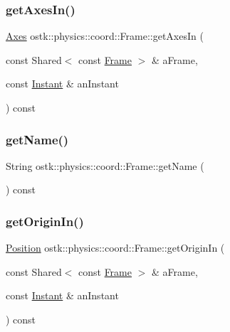 \mbox{\label{classostk_1_1physics_1_1coord_1_1_frame_ac75780963694dd74ea2e6a66f6ae17d8}} 
\subsubsection{\texorpdfstring{get\+Axes\+In()}{getAxesIn()}}
{\footnotesize\ttfamily \hyperlink{classostk_1_1physics_1_1coord_1_1_axes}{Axes} ostk\+::physics\+::coord\+::\+Frame\+::get\+Axes\+In (\begin{DoxyParamCaption}\item[{const Shared$<$ const \hyperlink{classostk_1_1physics_1_1coord_1_1_frame}{Frame} $>$ \&}]{a\+Frame,  }\item[{const \hyperlink{classostk_1_1physics_1_1time_1_1_instant}{Instant} \&}]{an\+Instant }\end{DoxyParamCaption}) const}

\mbox{\label{classostk_1_1physics_1_1coord_1_1_frame_a47aca195a73e14198f6d615c8988ce6e}} 
\subsubsection{\texorpdfstring{get\+Name()}{getName()}}
{\footnotesize\ttfamily String ostk\+::physics\+::coord\+::\+Frame\+::get\+Name (\begin{DoxyParamCaption}{ }\end{DoxyParamCaption}) const}

\mbox{\label{classostk_1_1physics_1_1coord_1_1_frame_a9f0544fd284d2ff4bca6a54dc8835bff}} 
\subsubsection{\texorpdfstring{get\+Origin\+In()}{getOriginIn()}}
{\footnotesize\ttfamily \hyperlink{classostk_1_1physics_1_1coord_1_1_position}{Position} ostk\+::physics\+::coord\+::\+Frame\+::get\+Origin\+In (\begin{DoxyParamCaption}\item[{const Shared$<$ const \hyperlink{classostk_1_1physics_1_1coord_1_1_frame}{Frame} $>$ \&}]{a\+Frame,  }\item[{const \hyperlink{classostk_1_1physics_1_1time_1_1_instant}{Instant} \&}]{an\+Instant }\end{DoxyParamCaption}) const}

